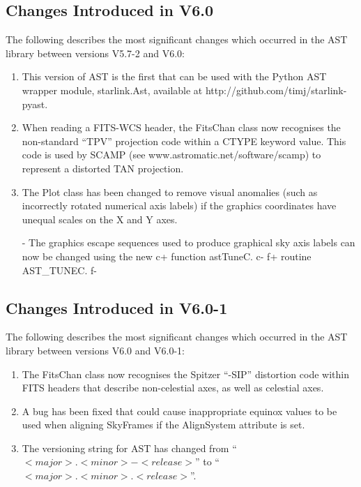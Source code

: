 \documentclass[twoside,11pt]{article}
\begin{document}
\subsection{Changes Introduced in V6.0}

The following describes the most significant changes which
occurred in the AST library between versions V5.7-2 and V6.0:

\begin{enumerate}

\item This version of AST is the first that can be used with the Python
AST wrapper module, starlink.Ast, available at http://github.com/timj/starlink-pyast.

\item When reading a FITS-WCS header, the FitsChan class now recognises the
non-standard ``TPV'' projection code within a CTYPE keyword value. This
code is used by SCAMP (see www.astromatic.net/software/scamp) to
represent a distorted TAN projection.

\item The Plot class has been changed to remove visual anomalies (such as
incorrectly rotated numerical axis labels) if the graphics coordinates have
unequal scales on the X and Y axes.

- The graphics escape sequences used to produce graphical sky axis labels
can now be changed using the new
c+
function astTuneC.
c-
f+
routine AST\_TUNEC.
f-

\end{enumerate}

\subsection{Changes Introduced in V6.0-1}

The following describes the most significant changes which
occurred in the AST library between versions V6.0 and V6.0-1:

\begin{enumerate}

\item The FitsChan class now recognises the Spitzer ``-SIP'' distortion
code within FITS headers that describe non-celestial axes, as well as
celestial axes.

\item A bug has been fixed that could cause inappropriate equinox values to
be used when aligning SkyFrames if the AlignSystem attribute is set.

\item The versioning string for AST has changed from
``$<major>.<minor>-<release>$'' to ``$<major>.<minor>.<release>$''.

\end{enumerate}
\end{document}
